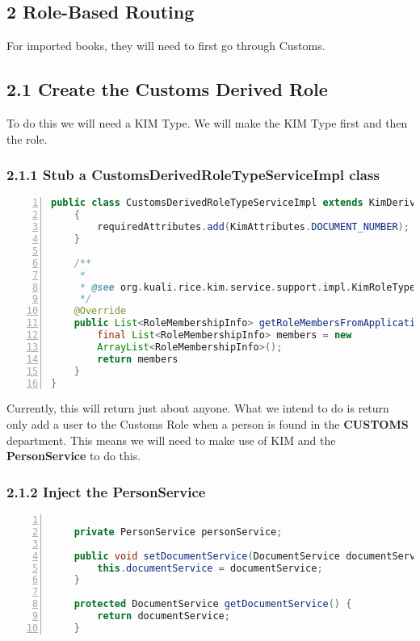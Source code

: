 \subsection*{2 Role-Based Routing}
For imported books, they will need to first go through Customs.

\subsection*{2.1 Create the Customs Derived Role}
To do this we will need a KIM Type. We will make the KIM Type first
and then the role.
\subsubsection*{2.1.1 Stub a CustomsDerivedRoleTypeServiceImpl class}
\begin{lstlisting}[numbers=left,language=java,basicstyle=\scriptsize,backgroundcolor=\color{ubergray},caption={Stubbed
  CustomsDerivedRoleTypeServiceImpl.java},frame=single,breaklines=true]
public class CustomsDerivedRoleTypeServiceImpl extends KimDerivedRoleTypeServiceBase {
    {
        requiredAttributes.add(KimAttributes.DOCUMENT_NUMBER);
    }

    /**
     * 
     * @see org.kuali.rice.kim.service.support.impl.KimRoleTypeServiceBase#getPrincipalIdsFromApplicationRole(java.lang.String, java.lang.String, org.kuali.rice.kim.bo.types.dto.AttributeSet)
     */
    @Override
    public List<RoleMembershipInfo> getRoleMembersFromApplicationRole(String namespaceCode, String roleName, AttributeSet qualification) {
        final List<RoleMembershipInfo> members = new
        ArrayList<RoleMembershipInfo>();
        return members
    }
}
\end{lstlisting}

Currently, this will return just about anyone. What we intend to do is
return only add a user to the Customs Role when a person is found in
the \textbf{CUSTOMS} department. This means we will need to make use
of KIM and the \textbf{PersonService} to do this. 

\subsubsection*{2.1.2 Inject the PersonService}
\begin{lstlisting}[numbers=left,language=java,basicstyle=\scriptsize,backgroundcolor=\color{ubergray},caption={Stubbed
    CustomsDerivedRoleTypeServiceImpl.java},frame=single,breaklines=true]

    private PersonService personService;

    public void setDocumentService(DocumentService documentService) {
        this.documentService = documentService;
    }

    protected DocumentService getDocumentService() {
        return documentService;
    }
\end{lstlisting}

